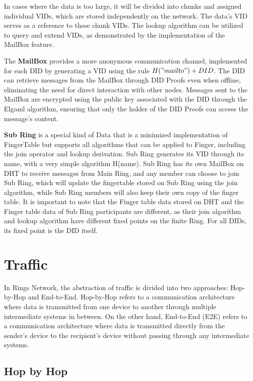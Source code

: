 \documentclass[twocolumn]{article}
\begin{document}
In cases where the data is too large, it will be divided into chunks and assigned individual VIDs, which are stored independently on the network. The data's VID serves as a reference to these chunk VIDs. The lookup algorithm can be utilized to query and extend VIDs, as demonstrated by the implementation of the MailBox feature.

The \textbf{MailBox} provides a more anonymous communication channel, implemented for each DID by generating a VID using the rule $H("mailto") + DID$. The DID can retrieve messages from the MailBox through DID Proofs even when offline, eliminating the need for direct interaction with other nodes. Messages sent to the MailBox are encrypted using the public key associated with the DID through the Elgaml algorithm, ensuring that only the holder of the DID Proofs can access the message's content.

\textbf{Sub Ring} is a special kind of Data that is a minimized implementation of FingerTable but supports all algorithms that can be applied to Finger, including the join operator and lookup derivation. Sub Ring generates its VID through its name, with a very simple algorithm H(name). Sub Ring has its own MailBox on DHT to receive messages from Main Ring, and any member can choose to join Sub Ring, which will update the fingertable stored on Sub Ring using the join algorithm, while Sub Ring members will also keep their own copy of the finger table. It is important to note that the Finger table data stored on DHT and the Finger table data of Sub Ring participants are different, as their join algorithm and lookup algorithm have different fixed points on the finite Ring. For all DIDs, its fixed point is the DID itself.

\section{Traffic}

In Rings Network, the abstraction of traffic is divided into two approaches: Hop-by-Hop and End-to-End. Hop-by-Hop refers to a communication architecture where data is transmitted from one device to another through multiple intermediate systems in between. On the other hand, End-to-End (E2E) refers to a communication architecture where data is transmitted directly from the sender's device to the recipient's device without passing through any intermediate systems.


\subsection{Hop by Hop}
\end{document}
